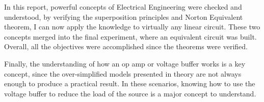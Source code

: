 \documentclass[english,12pt]{article}
\begin{document}
In this report, powerful concepts of Electrical Engineering were checked and understood, by verifying the superposition principles and Norton Equivalent theorem, I can now apply the knowledge to virtually any linear circuit. These two concepts merged into the final experiment, where an equivalent circuit was built. Overall, all the objectives were accomplished since the theorems were verified.

Finally, the understanding of how an op amp or voltage buffer works is a key concept, since the over-simplified models presented in theory are not always enough to produce a practical result. In these scenarios, knowing how to use the voltage buffer to reduce the load of the source is a major concept to understand.
\end{document}
